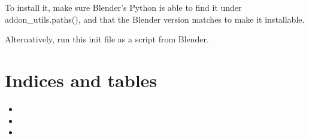 \documentclass[letterpaper,10pt,english,openany,oneside]{sphinxmanual}
\begin{document}
To install it, make sure Blender’s Python is able to find it under
addon\_utils.paths(), and that the Blender version matches to make it
installable.

Alternatively, run this init file as a script from Blender.

\begin{fulllineitems}
\label{\detokenize{mpiea_mmr:mpiea_mmr.register}}
\end{fulllineitems}


\begin{fulllineitems}
\label{\detokenize{mpiea_mmr:mpiea_mmr.unregister}}
\end{fulllineitems}



\chapter{Indices and tables}
\label{\detokenize{index:indices-and-tables}}\begin{itemize}
\item {} 

\item {} 

\item {} 

\end{itemize}


\renewcommand{\indexname}{Python Module Index}
\begin{sphinxtheindex}
\let\bigletter\sphinxstyleindexlettergroup
\bigletter{m}
\item\relax{}
\item\relax{}
\item\relax{}
\end{sphinxtheindex}

\renewcommand{\indexname}{Index}
\printindex
\end{document}
